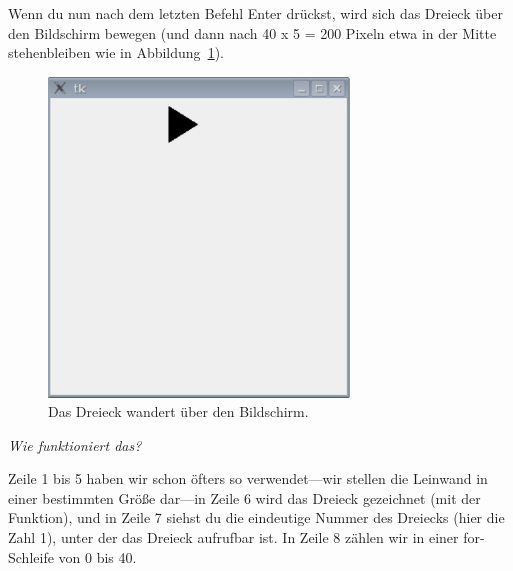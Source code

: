 Wenn du nun nach dem letzten Befehl Enter drückst, wird sich das Dreieck über den Bildschirm bewegen (und dann nach 40 x 5 = 200 Pixeln etwa in der Mitte stehenbleiben wie in Abbildung~\ref{fig44}).

\begin{figure}
\begin{center}
\includegraphics[width=80mm]{images/figure44}
\end{center}
\caption{Das Dreieck wandert über den Bildschirm.}\label{fig44}
\end{figure}

\par
\emph{Wie funktioniert das?}
\par
Zeile 1 bis 5 haben wir schon öfters so verwendet---wir stellen die Leinwand in einer bestimmten Größe dar---in Zeile 6 wird das Dreieck gezeichnet (mit der  Funktion), und in Zeile 7 siehst du die eindeutige Nummer des Dreiecks (hier die Zahl 1), unter der das Dreieck aufrufbar ist. In Zeile 8 zählen wir in einer for-Schleife von 0 bis 40.

